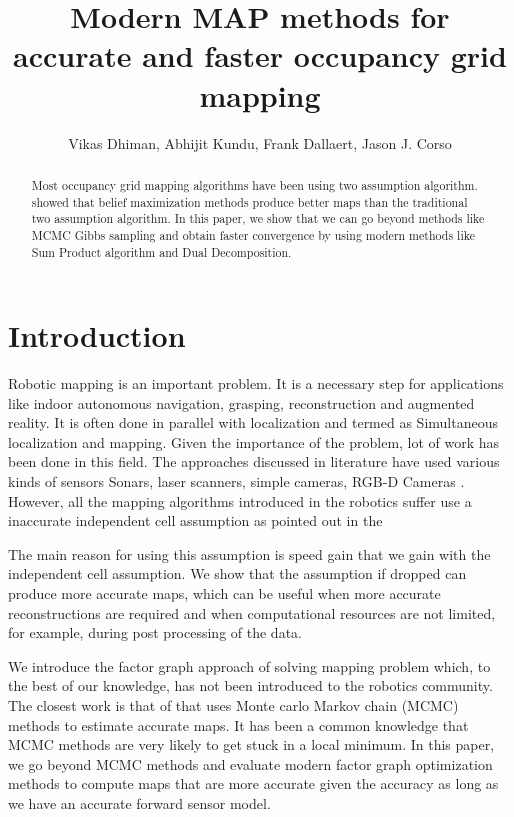\documentclass[letterpaper, 10 pt, conference]{ieeeconf} %
\title{Modern MAP methods for accurate and faster occupancy grid mapping}
\author{Vikas Dhiman, Abhijit Kundu, Frank Dallaert, Jason J. Corso}
\begin{document}
\maketitle
\begin{abstract}
  Most occupancy grid mapping algorithms have been using two assumption
  algorithm.  \cite{merali2013icra} showed that belief maximization methods
  produce better maps than the traditional two assumption algorithm.  In this
  paper, we show that we can go beyond methods like MCMC Gibbs sampling and
  obtain faster convergence by using modern methods like Sum Product algorithm
  and Dual Decomposition.
\end{abstract}
\section{Introduction}
Robotic mapping is an important problem. It is a necessary step for applications like indoor autonomous navigation, grasping, reconstruction and augmented reality. It is often done in parallel with localization and termed as Simultaneous localization and mapping. Given the importance of the problem, lot of work has been done in this field. The approaches discussed in literature have used various kinds of sensors 
Sonars,%
laser scanners, %
simple cameras, %
RGB-D Cameras \cite{newcombe2011kinectfusion, whelan2013robust, whelan2012kintinuous}. 
However, all the mapping algorithms introduced in the robotics suffer use a inaccurate independent cell assumption as pointed out in the %

The main reason for using this assumption is speed gain that we gain with the independent cell assumption. We show that the assumption if dropped can produce more accurate maps, which can be useful when more accurate reconstructions are required and when computational resources are not limited, for example, during post processing of the data.

We introduce the factor graph approach of solving mapping problem which, to the best of our knowledge, has not been introduced to the robotics community. The closest work is that of \cite{merali2013icra} that uses Monte carlo Markov chain (MCMC) methods to estimate accurate maps. It has been a common knowledge that MCMC methods are very likely to get stuck in a local minimum. In this paper, we go beyond MCMC methods and evaluate modern factor graph optimization methods to compute maps that are more accurate given the accuracy as long as we have an accurate forward sensor model.
\end{document}
